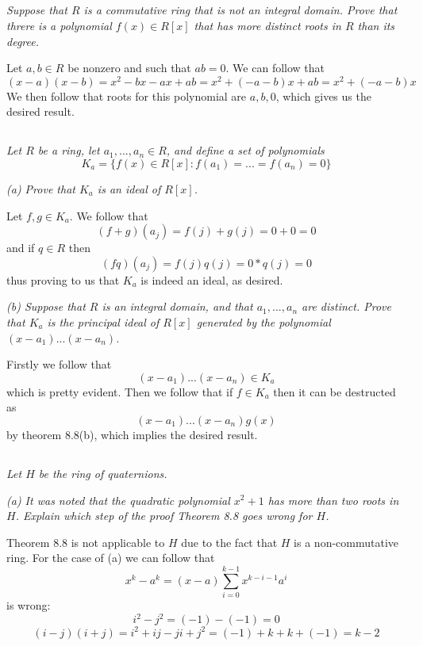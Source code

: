 \documentclass[11pt,oneside,titlepage]{book}
\newcommand{\set}[1]{\{ #1 \}}
\begin{document}
\subsection{}

\textit{Suppose that $R$ is a commutative ring that is not an integral
  domain. Prove that threre is a polynomial $f(x) \in R[x]$ that has more distinct
  roots in $R$ than its degree.}

Let $a, b \in R$ be nonzero and such that $ab = 0$. We can follow that
$$(x - a)(x - b) = x^2 - bx - ax + ab = x^2 + (-a - b)x + ab = x^2 + (-a - b)x$$
We then follow that roots for this polynomial are $a, b, 0$, which
gives us the desired result.

\subsection{}

\textit{Let $R$ be a ring, let $a_1, ..., a_n \in R$, and define a set of polynomials
  $$K_a = \set{f(x) \in R[x]: f(a_1) = ... = f(a_n) = 0}$$}

\textit{(a) Prove that $K_a$ is an ideal of $R[x]$.}

Let $f, g \in K_a$. We follow that
$$(f + g)(a_j) = f(j) + g(j) = 0 + 0 = 0$$
and if $q \in R$ then
$$(fq)(a_j) = f(j) q(j) = 0 * q(j) = 0$$
thus proving to us that $K_a$ is indeed an ideal, as desired.

\textit{(b) Suppose that $R$ is an integral domain, and that $a_1,
..., a_n$ are distinct. Prove that $K_a$ is the principal ideal of
$R[x]$ generated by the polynomial $(x - a_1) ... (x - a_n)$.}

Firstly we follow that
$$(x - a_1) ... (x - a_n) \in K_a$$
which is pretty evident.
Then we follow that if $f \in K_a$ then it can be destructed as
$$(x - a_1) ... (x - a_n) g(x)$$
by theorem 8.8(b), which implies the desired result.

\subsection{}

\textit{Let $H$ be the ring of quaternions.}

\textit{(a) It was noted that the quadratic polynomial $x^2 + 1$ has
  more than two roots in $H$. Explain which step of the proof Theorem
  8.8 goes wrong for $H$.}

Theorem 8.8 is not applicable to $H$ due to the fact that $H$ is a
non-commutative ring. For the case of (a) we can follow that
$$x^k - a^k = (x - a) \sum_{i = 0}^{k - 1}{x^{k - i - 1} a^i }$$
is wrong:
$$i^2 - j^2 = (-1) - (-1) = 0$$
$$(i - j)(i + j) = i^2 + ij - ji + j^2 = (-1) + k + k + (-1) = k - 2$$
\end{document}
